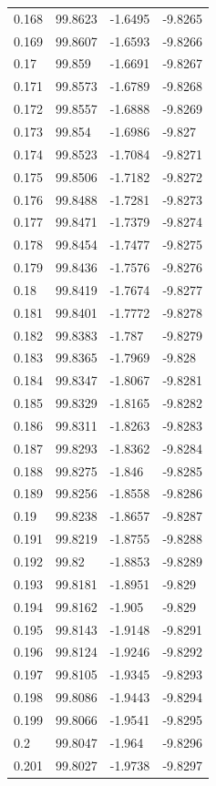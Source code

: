 \begin{tabular}{llll}
0.168 & 99.8623 & -1.6495 & -9.8265 \\
0.169 & 99.8607 & -1.6593 & -9.8266 \\
0.17 & 99.859 & -1.6691 & -9.8267 \\
0.171 & 99.8573 & -1.6789 & -9.8268 \\
0.172 & 99.8557 & -1.6888 & -9.8269 \\
0.173 & 99.854 & -1.6986 & -9.827 \\
0.174 & 99.8523 & -1.7084 & -9.8271 \\
0.175 & 99.8506 & -1.7182 & -9.8272 \\
0.176 & 99.8488 & -1.7281 & -9.8273 \\
0.177 & 99.8471 & -1.7379 & -9.8274 \\
0.178 & 99.8454 & -1.7477 & -9.8275 \\
0.179 & 99.8436 & -1.7576 & -9.8276 \\
0.18 & 99.8419 & -1.7674 & -9.8277 \\
0.181 & 99.8401 & -1.7772 & -9.8278 \\
0.182 & 99.8383 & -1.787 & -9.8279 \\
0.183 & 99.8365 & -1.7969 & -9.828 \\
0.184 & 99.8347 & -1.8067 & -9.8281 \\
0.185 & 99.8329 & -1.8165 & -9.8282 \\
0.186 & 99.8311 & -1.8263 & -9.8283 \\
0.187 & 99.8293 & -1.8362 & -9.8284 \\
0.188 & 99.8275 & -1.846 & -9.8285 \\
0.189 & 99.8256 & -1.8558 & -9.8286 \\
0.19 & 99.8238 & -1.8657 & -9.8287 \\
0.191 & 99.8219 & -1.8755 & -9.8288 \\
0.192 & 99.82 & -1.8853 & -9.8289 \\
0.193 & 99.8181 & -1.8951 & -9.829 \\
0.194 & 99.8162 & -1.905 & -9.829 \\
0.195 & 99.8143 & -1.9148 & -9.8291 \\
0.196 & 99.8124 & -1.9246 & -9.8292 \\
0.197 & 99.8105 & -1.9345 & -9.8293 \\
0.198 & 99.8086 & -1.9443 & -9.8294 \\
0.199 & 99.8066 & -1.9541 & -9.8295 \\
0.2 & 99.8047 & -1.964 & -9.8296 \\
0.201 & 99.8027 & -1.9738 & -9.8297 \\

\end{tabular}

